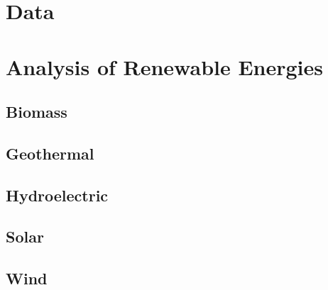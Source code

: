 \documentclass[12pt]{article}
\begin{document}
\newpage

\section{Data}

\newpage

\section{Analysis of Renewable Energies}

\subsection{Biomass}

\subsection{Geothermal}

\subsection{Hydroelectric}

\subsection{Solar}

\subsection{Wind}

\begin{thebibliography}{}

\end{thebibliography}
\end{document}
